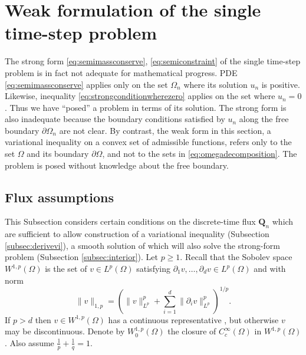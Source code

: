\documentclass[final,onefignum]{siamart190516}
\newcommand\bQ{\mathbf{Q}}
\begin{document}
\section{Weak formulation of the single time-step problem}  \label{sec:weakform}

The strong form \eqref{eq:semimassconserve}, \eqref{eq:semiconstraint} of the single time-step problem is in fact not adequate for mathematical progress.  PDE \eqref{eq:semimassconserve} applies only on the set $\Omega_n$ where its solution $u_n$ is positive.  Likewise, inequality \eqref{eq:strongconditionwherezero} applies on the set where $u_n=0$.  Thus we have ``posed'' a problem in terms of its solution.  The strong form is also inadequate because the boundary conditions satisfied by $u_n$ along the free boundary $\partial\Omega_n$ are not clear.  By contrast, the weak form in this section, a variational inequality \cite{Friedman1982,KinderlehrerStampacchia1980} on a convex set of admissible functions, refers only to the set $\Omega$ and its boundary $\partial\Omega$, and not to the sets in \eqref{eq:omegadecomposition}.  The problem is posed without knowledge about the free boundary.

\subsection{Flux assumptions} \label{subsec:fluxassumptions}  This Subsection considers certain conditions on the discrete-time flux $\bQ_n$ which are sufficient to allow construction of a variational inequality (Subsection \ref{subsec:derivevi}), a smooth solution of which will also solve the strong-form problem (Subsection \ref{subsec:interior}).  Let $p\ge 1$.  Recall that the Sobolev space $W^{1,p}(\Omega)$ \cite{Evans2010} is the set of $v \in L^p(\Omega)$ satisfying $\partial_1 v,\dots,\partial_d v \in L^p(\Omega)$ and with norm
\begin{equation}
  \|v\|_{1,p} = \left(\|v\|_{L^p}^p + \sum_{i=1}^d \|\partial_i v\|_{L^p}^p\right)^{1/p}.  \label{eq:norm}
\end{equation}
If $p>d$ then $v\in W^{1,p}(\Omega)$ has a continuous representative \cite[``Morrey's inequality'']{Evans2010}, but otherwise $v$ may be discontinuous.  Denote by $W_0^{1,p}(\Omega)$ the closure of $C_c^\infty(\Omega)$ in $W^{1,p}(\Omega)$.  Also assume $\frac{1}{p}+\frac{1}{q}=1$.
\end{document}
